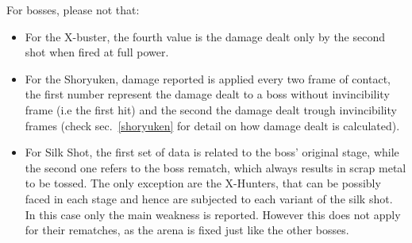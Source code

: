 For bosses, please not that:
\begin{itemize}
	\item For the X-buster, the fourth value is the damage dealt only by the second shot when fired at full power.
	\item For the Shoryuken, damage reported is applied every two frame of contact, the first number represent the damage dealt to a boss without invincibility frame (i.e the first hit) and the second the damage dealt trough invincibility frames (check sec.~\ref{shoryuken} for detail on how damage dealt is calculated).
	
	\item For Silk Shot, the first set of data is related to the boss' original stage, while the second one refers to the boss rematch, which always results in scrap metal to be tossed. The only exception are the X-Hunters, that can be possibly faced in each stage and hence are subjected to each variant of the silk shot. In this case only the main weakness is reported. However this does not apply for their rematches, as the arena is fixed just like the other bosses.%
\end{itemize}

